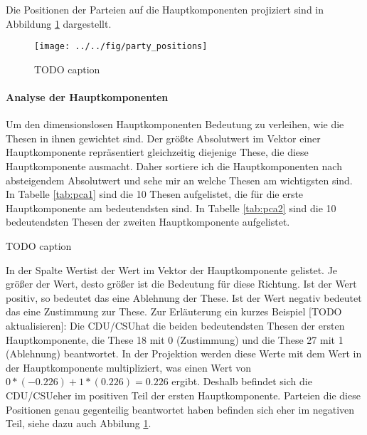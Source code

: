 Die Positionen der Parteien auf die Hauptkomponenten projiziert sind in Abbildung \ref{fig:party-positions-pca} dargestellt.

\begin{figure}[htb]
	\centering
	\texttt{[image: ../../fig/party\_positions]}
	\caption{TODO caption}
	\label{fig:party-positions-pca}
\end{figure}

\paragraph{Analyse der Hauptkomponenten}
Um den dimensionslosen Hauptkomponenten Bedeutung zu verleihen, wie die Thesen in ihnen gewichtet sind. Der größte Absolutwert im Vektor einer Hauptkomponente repräsentiert gleichzeitig diejenige These, die diese Hauptkomponente ausmacht. Daher sortiere ich die Hauptkomponenten nach absteigendem Absolutwert und sehe mir an welche Thesen am wichtigsten sind.
In Tabelle \ref{tab:pca1} sind die 10 Thesen aufgelistet, die für die erste Hauptkomponente am bedeutendsten sind. In Tabelle \ref{tab:pca2} sind die 10 bedeutendsten Thesen der zweiten Hauptkomponente aufgelistet.

\begin{table}[htb]
	\centering
	\caption{TODO caption}
	\label{tab:pca1}
\end{table}

In der Spalte \glqq Wert\grqq ist der Wert im Vektor der Hauptkomponente gelistet. Je größer der Wert, desto größer ist die Bedeutung für diese Richtung. Ist der Wert positiv, so bedeutet das eine Ablehnung der These. Ist der Wert negativ bedeutet das eine Zustimmung zur These.
Zur Erläuterung ein kurzes Beispiel [TODO aktualisieren]: Die \glqq CDU/CSU\grqq hat die beiden bedeutendsten Thesen der ersten Hauptkomponente, die These 18 mit 0 (Zustimmung) und die These 27 mit 1 (Ablehnung) beantwortet. In der Projektion werden diese Werte mit dem Wert in der Hauptkomponente multipliziert, was einen Wert von $0*(-0.226)+1*(0.226)=0.226$ ergibt. Deshalb befindet sich die \glqq CDU/CSU\grqq eher im positiven Teil der ersten Hauptkomponente. Parteien die diese Positionen genau gegenteilig beantwortet haben befinden sich eher im negativen Teil, siehe dazu auch Abbilung \ref{fig:party-positions-pca}.

